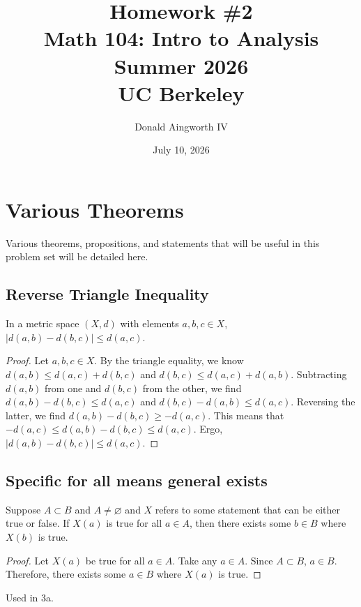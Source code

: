 \documentclass[11pt]{article}
\title{Homework \#2\\{\large Math 104: Intro to Analysis \\ Summer 2026} \\ {\normalsize UC Berkeley}}
\date{July 10, 2026}
\author{Donald Aingworth IV}
\begin{document}
\renewcommand\qedsymbol{OE$\Delta$}
\newcommand{\abs}[1]{\left| #1 \right|}
\newcommand{\andtxt}{\text{ and }}
\newcommand{\Ais}{\ensuremath{\overset{A}{=}}}
\newcommand{\Cis}{\ensuremath{\overset{C}{=}}}
\newcommand{\closure}[1]{\ensuremath{\overline{#1}}}
\newcommand{\encircle}[1]{%
  \tikz[baseline=(char.base)]{%
    \node[shape=circle, draw, inner sep=1pt] (char) {#1};%
  }%
}
\newcommand{\mathif}{\text{if }}
\newcommand{\seq}[2][n]{\ensuremath{\left\{ #2 _{#1} \right\}}}
\newcommand{\zz}[1]{$\mathbb{Z}/ #1 \mathbb{Z}$}

\maketitle

\tableofcontents

\pagebreak
\setcounter{section}{-1}
\section{Various Theorems}
    Various theorems, propositions, and statements that will be useful in this problem set will be detailed here.
    \subsection{Reverse Triangle Inequality}
        In a metric space $(X,d)$ with elements $a, b, c \in X$, $\abs{d(a,b) - d(b,c)} \leq d(a,c)$.
        \begin{proof}
            Let $a, b, c \in X$.
            By the triangle equality, we know $d(a,b) \leq d(a,c) + d(b,c)$ and $d(b,c) \leq d(a,c) + d(a,b)$.
            Subtracting $d(a,b)$ from one and $d(b,c)$ from the other, we find $d(a,b) - d(b,c) \leq d(a,c)$ and $d(b,c) - d(a,b) \leq d(a,c)$.
            Reversing the latter, we find $d(a,b) - d(b,c) \geq -d(a,c)$.
            This means that $-d(a,c) \leq d(a,b) - d(b,c) \leq d(a,c)$.
            Ergo, $\abs{d(a,b) - d(b,c)} \leq d(a,c)$.
        \end{proof} 

    \subsection{Specific for all means general exists}
        Suppose $A \subset B$ and $A \neq \varnothing$ and $X$ refers to some statement that can be either true or false. If $X(a)$ is true for all $a \in A$, then there exists some $b \in B$ where $X(b)$ is true.
        \begin{proof}
            Let $X(a)$ be true for all $a \in A$.
            Take any $a \in A$.
            Since $A \subset B$, $a \in B$.
            Therefore, there exists some $a \in B$ where $X(a)$ is true.
        \end{proof}
        Used in 3a.
\end{document}
